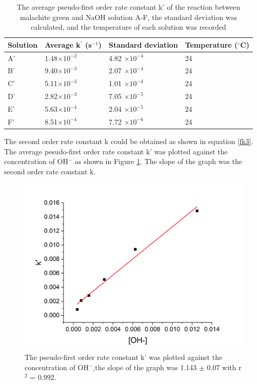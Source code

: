 \documentclass[twocolumn]{article} %
\begin{document}
\begin{table}[h]
    \caption{The average pseudo-first order rate constant k' of the reaction between malachite green and NaOH solution A-F, the standard deviation was calculated, and the temperature of each solution was recorded}
    \label{A-F average}
    \begin{tabular}{L{0.4in}C{1in}C{1in}C{0.6in}}\toprule
        Solution & Average k$^\prime$ (s$^{-1}$)& Standard deviation & Temperature ($^\circ$C)\\\midrule
        A' & 1.48$\times 10^{-2}$ & 4.82 $\times 10^{-4}$  & 24\\
        B' & 9.40$\times 10^{-3}$ & 2.07 $\times 10^{-4}$  &24 \\
        C' & 5.11$\times 10^{-3}$ & 1.01 $\times 10^{-4}$ &24\\
        D' & 2.82$\times 10^{-3}$ & 7.05 $\times 10^{-5}$ &24 \\
        E' & 5.63$\times 10^{-4}$ & 2.04 $\times 10^{-5}$ &24\\
        F' & 8.51$\times 10^{-4}$ & 7.72 $\times 10^{-6}$ &24\\\bottomrule
   \end{tabular}
\end{table}

The second order rate constant k could be obtained as shown in equation \ref{fk3}. The average pesudo-first order rate constant k' was plotted against the concentration of OH$^-$ as shown in Figure \ref{k}. The slope of the graph was the second order rate constant k.

\begin{figure}[H]
    \centering
    \includegraphics[width=\columnwidth]{part1 k.png}
    \caption{The pseudo-first order rate constant k' was plotted against the concentration of OH$^-$,the slope of the graph was 1.143 $\pm$ 0.07 with r$^2$ = 0.992.}
    \label{k}
\end{figure}
\end{document}
